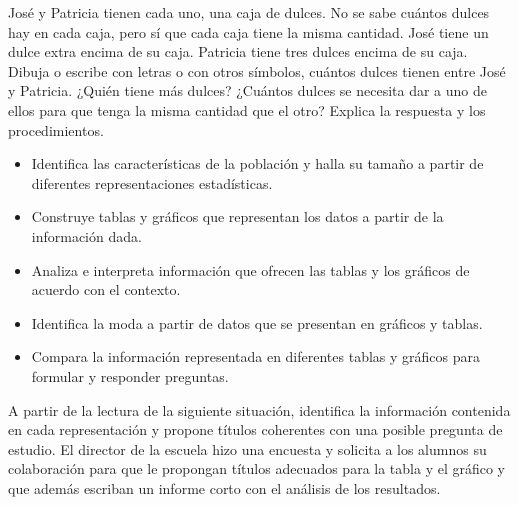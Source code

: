 \ejemplo

José y Patricia tienen cada uno, una caja de dulces. No se sabe cuántos dulces hay en cada caja, pero sí que cada caja tiene la misma cantidad. José tiene un dulce extra encima de su caja. Patricia tiene tres dulces encima de su caja. Dibuja o escribe con letras o con otros símbolos, cuántos dulces tienen entre José y Patricia. ¿Quién tiene más dulces? ¿Cuántos dulces se necesita dar a uno de ellos para que tenga la misma cantidad que el otro? Explica la respuesta y los procedimientos.


\evidencias

\begin{itemize}
  \item Identifica las características de la población y halla su tamaño a partir de diferentes representaciones estadísticas.
  \item Construye tablas y gráficos que representan los datos a partir de la información dada.
  \item Analiza e interpreta información que ofrecen las tablas y los gráficos de acuerdo con el contexto.
  \item Identifica la moda a partir de datos que se presentan en gráficos y tablas.
  \item Compara la información representada en diferentes tablas y gráficos para formular y responder preguntas.
\end{itemize}

\ejemplo

A partir de la lectura de la siguiente situación, identifica la información contenida en cada representación y propone títulos coherentes con una posible pregunta de estudio. El director de la escuela hizo una encuesta y solicita a los alumnos su colaboración para que le propongan títulos adecuados para la tabla y el gráfico y que además escriban un informe corto con el análisis de los resultados.



